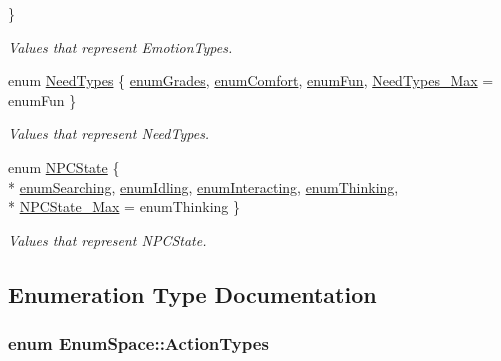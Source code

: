 \begin{DoxyCompactItemize}
 \}
\begin{DoxyCompactList}\small\item\em Values that represent Emotion\-Types. \end{DoxyCompactList}\item 
enum \hyperlink{namespace_enum_space_ada24edd57fcc0c3b4db98ffe57ce66d6}{Need\-Types} \{ \hyperlink{namespace_enum_space_ada24edd57fcc0c3b4db98ffe57ce66d6aea2e0e8a60076b64e293dbe12caf67c9}{enum\-Grades}, 
\hyperlink{namespace_enum_space_ada24edd57fcc0c3b4db98ffe57ce66d6a5f4987a2791d6eca60690ff1ee74172f}{enum\-Comfort}, 
\hyperlink{namespace_enum_space_ada24edd57fcc0c3b4db98ffe57ce66d6ae0ac82119c212e05f97d9645e3184622}{enum\-Fun}, 
\hyperlink{namespace_enum_space_ada24edd57fcc0c3b4db98ffe57ce66d6aae6ac4b66b111c1b5070dc40ca81df2a}{Need\-Types\-\_\-\-Max} = enum\-Fun
 \}
\begin{DoxyCompactList}\small\item\em Values that represent Need\-Types. \end{DoxyCompactList}\item 
enum \hyperlink{namespace_enum_space_af5767afe7babbfcaa353e7292b2876c5}{N\-P\-C\-State} \{ \\*
\hyperlink{namespace_enum_space_af5767afe7babbfcaa353e7292b2876c5a3631d184169d4e28c457d4f1b30d356d}{enum\-Searching}, 
\hyperlink{namespace_enum_space_af5767afe7babbfcaa353e7292b2876c5a5aa04c6c87b66390da3a72450a7c6192}{enum\-Idling}, 
\hyperlink{namespace_enum_space_af5767afe7babbfcaa353e7292b2876c5a1d0ccb62164a9c1a9ad531a1c0a128dc}{enum\-Interacting}, 
\hyperlink{namespace_enum_space_af5767afe7babbfcaa353e7292b2876c5a85876bf8a67d1a589eedc4c2621082c1}{enum\-Thinking}, 
\\*
\hyperlink{namespace_enum_space_af5767afe7babbfcaa353e7292b2876c5a788015de43b044415beb34258fe7e162}{N\-P\-C\-State\-\_\-\-Max} = enum\-Thinking
 \}
\begin{DoxyCompactList}\small\item\em Values that represent N\-P\-C\-State. \end{DoxyCompactList}\end{DoxyCompactItemize}


\subsection{Enumeration Type Documentation}
\hypertarget{namespace_enum_space_a12df93435ce38acf7185878d223161f8}{
\subsubsection[{Action\-Types}]{\setlength{\rightskip}{0pt plus 5cm}enum {\bf Enum\-Space\-::\-Action\-Types}}}\label{namespace_enum_space_a12df93435ce38acf7185878d223161f8}


